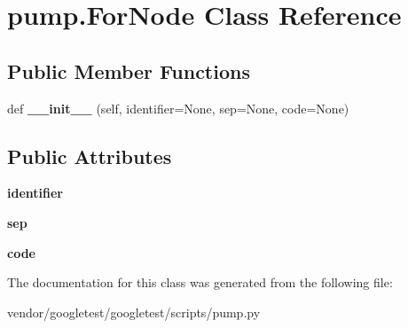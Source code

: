 \hypertarget{classpump_1_1ForNode}{}\section{pump.\+For\+Node Class Reference}
\label{classpump_1_1ForNode}
\subsection*{Public Member Functions}
\begin{DoxyCompactItemize}
\item 
def {\bfseries \+\_\+\+\_\+init\+\_\+\+\_\+} (self, identifier=None, sep=None, code=None)\hypertarget{classpump_1_1ForNode_a9cf60468cacdb06acce35074ab2a2b55}{}\label{classpump_1_1ForNode_a9cf60468cacdb06acce35074ab2a2b55}

\end{DoxyCompactItemize}
\subsection*{Public Attributes}
\begin{DoxyCompactItemize}
\item 
{\bfseries identifier}\hypertarget{classpump_1_1ForNode_a2444199e135e43696b3a006bd0d38982}{}\label{classpump_1_1ForNode_a2444199e135e43696b3a006bd0d38982}

\item 
{\bfseries sep}\hypertarget{classpump_1_1ForNode_a06b493278b3c1ad53363a2bcc3b8efb3}{}\label{classpump_1_1ForNode_a06b493278b3c1ad53363a2bcc3b8efb3}

\item 
{\bfseries code}\hypertarget{classpump_1_1ForNode_afdb5f4f2a3bc772bbc6ea777dfde898e}{}\label{classpump_1_1ForNode_afdb5f4f2a3bc772bbc6ea777dfde898e}

\end{DoxyCompactItemize}


The documentation for this class was generated from the following file\+:\begin{DoxyCompactItemize}
\item 
vendor/googletest/googletest/scripts/pump.\+py\end{DoxyCompactItemize}
